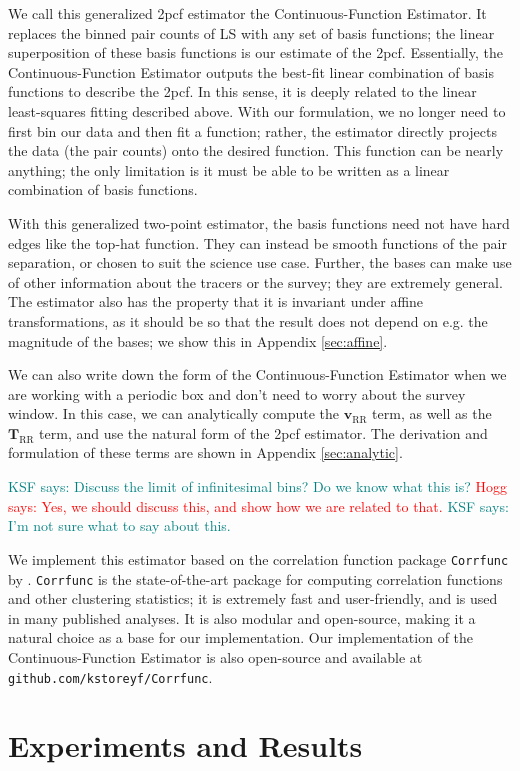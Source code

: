 \documentclass[modern]{aastex62}
\newcommand{\cf}{2pcf\xspace} %
\newcommand{\est}{the Continuous-Function Estimator\xspace}
\newcommand{\LS}{LS\xspace}
\newcommand{\bld}[1]{\bm{#1}} %
\newcommand{\vv}[1]{\bld{v}_\mathrm{#1}}
\newcommand{\TT}[1]{\bld{T}_\mathrm{#1}}
\newcommand{\KSF}[1]{\textcolor{teal}{KSF says: #1}}
\newcommand{\hogg}[1]{\textcolor{red}{Hogg says: #1}}
\begin{document}
We call this generalized \cf estimator \est.
It replaces the binned pair counts of \LS with any set of basis functions; the linear superposition of these basis functions is our estimate of the \cf.
Essentially, \est outputs the best-fit linear combination of basis functions to describe the \cf.
In this sense, it is deeply related to the linear least-squares fitting described above.
With our formulation, we no longer need to first bin our data and then fit a function; rather, the estimator directly projects the data (the pair counts) onto the desired function.
This function can be nearly anything; the only limitation is it must be able to be written as a linear combination of basis functions.

With this generalized two-point estimator, the basis functions need not have hard edges like the top-hat function.
They can instead be smooth functions of the pair separation, or chosen to suit the science use case.
Further, the bases can make use of other information about the tracers or the survey; they are extremely general.
The estimator also has the property that it is invariant under affine transformations, as it should be so that the result does not depend on e.g. the magnitude of the bases; we show this in Appendix \ref{sec:affine}.

We can also write down the form of \est when we are working with a periodic box and don't need to worry about the survey window.
In this case, we can analytically compute the $\vv{RR}$ term, as well as the $\TT{RR}$ term, and use the natural form of the \cf estimator.
The derivation and formulation of these terms are shown in Appendix \ref{sec:analytic}.

\KSF{Discuss the limit of infinitesimal bins? Do we know what this is?} \hogg{Yes, we should discuss this, and show how we are related to that.} \KSF{I'm not sure what to say about this.}

We implement this estimator based on the correlation function package \texttt{Corrfunc} by \cite{Sinha2019}.
\texttt{Corrfunc} is the state-of-the-art package for computing correlation functions and other clustering statistics; it is extremely fast and user-friendly, and is used in many published analyses.
It is also modular and open-source, making it a natural choice as a base for our implementation.
Our implementation of \est is also open-source and available at \texttt{github.com/kstoreyf/Corrfunc}.


\section{Experiments and Results}
\label{sec:experiments}
\end{document}
